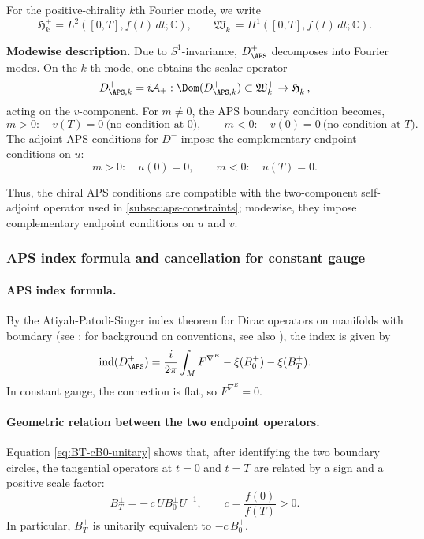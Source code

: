 \documentclass[11pt]{article}
\newcommand{\C}{\mathbb{C}}
\theoremstyle{definition}
\DeclareMathOperator{\ind}{ind}
\numberwithin{equation}{section}
\begin{document}
For the positive-chirality \(k\)th Fourier mode, we write
\begin{equation}
\mathfrak H_k^+=L^2([0,T],f(t)\,dt;\C),\qquad
\mathfrak W_k^+=H^1([0,T],f(t)\,dt;\C).
\end{equation}

\medskip
\noindent\textbf{Modewise description.}
Due to $S^1$-invariance, $D^+_{\APS}$ decomposes into Fourier modes.
On the $k$-th mode, one obtains the scalar operator
\begin{equation}
D^+_{\APS,k}=i\mathcal{A}_+:
\Dom(D^+_{\APS,k})\subset \mathfrak W_k^+\to \mathfrak H_k^+,
\end{equation}
acting on the $v$-component.
For $m\neq 0$, the APS boundary condition becomes,
\begin{equation}
m>0:\quad v(T)=0 \ \text{(no condition at }0),
\qquad
m<0:\quad v(0)=0 \ \text{(no condition at }T).
\end{equation}
The adjoint APS conditions for $D^-$ impose the complementary endpoint conditions on $u$:
\begin{equation}
m>0:\quad u(0)=0,
\qquad
m<0:\quad u(T)=0.
\end{equation}

Thus, the chiral APS conditions are compatible with the two-component self-adjoint operator used in \autoref{subsec:aps-constraints}; modewise, they impose complementary endpoint conditions on $u$ and $v$.

\subsubsection{APS index formula and cancellation for constant gauge}
\label{subsubsec:eta-cancellation}

\paragraph{APS index formula.}
By the Atiyah-Patodi-Singer index theorem for Dirac operators on manifolds with boundary
(see \cite[Theorem~4.2]{APS1}; for background on conventions, see also \cite{LawsonMichelsohn,BGV}), the index is given by
\begin{equation}
\label{eq:APSindex}
\ind(D^+_{\APS})
=
\frac{i}{2\pi}\int_M F^{\nabla^E}
-\xi(B_0^+)-\xi(B_T^+).
\end{equation}
In constant gauge, the connection is flat, so \(F^{\nabla^E}=0\).

\paragraph{Geometric relation between the two endpoint operators.}
Equation \eqref{eq:BT-cB0-unitary} shows that, after identifying the two boundary circles, the tangential operators at $t=0$ and $t=T$ are related by a sign and a positive scale factor:
\begin{equation}
B_T^\pm=-\,c\,U B_0^\pm U^{-1},
\qquad
c=\frac{f(0)}{f(T)}>0.
\end{equation}
In particular, $B_T^+$ is unitarily equivalent to $-c\,B_0^+$.
\end{document}
